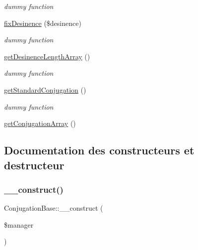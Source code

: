 \begin{DoxyCompactItemize}
\begin{DoxyCompactList}\small\item\em dummy function \end{DoxyCompactList}\item 
\hyperlink{classConjugationBase_ab983db20dcc0f19fdce07fd4a8fdbc18}{fix\+Desinence} (\$desinence)
\begin{DoxyCompactList}\small\item\em dummy function \end{DoxyCompactList}\item 
\hyperlink{classConjugationBase_a9b0524f2dde45dcdc8f6c27d673c827a}{get\+Desinence\+Length\+Array} ()
\begin{DoxyCompactList}\small\item\em dummy function \end{DoxyCompactList}\item 
\hyperlink{classConjugationBase_a97684bf47a4b158a2d4f5716f9187730}{get\+Standard\+Conjugation} ()
\begin{DoxyCompactList}\small\item\em dummy function \end{DoxyCompactList}\item 
\hyperlink{classConjugationBase_a4358d211e7c70a82657e5418a554a555}{get\+Conjugation\+Array} ()
\end{DoxyCompactItemize}


\subsection{Documentation des constructeurs et destructeur}
\hypertarget{classConjugationBase_aff646e04e878c9dd1473de4619fe1bcc}{}\label{classConjugationBase_aff646e04e878c9dd1473de4619fe1bcc} 
\subsubsection{\texorpdfstring{\+\_\+\+\_\+construct()}{\_\_construct()}}
{\footnotesize\ttfamily Conjugation\+Base\+::\+\_\+\+\_\+construct (\begin{DoxyParamCaption}\item[{\hyperlink{classConjugationManagerBase}{Conjugation\+Manager\+Base}}]{\$manager }\end{DoxyParamCaption})}



